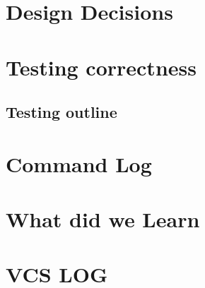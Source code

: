 \documentclass[onecolumn, draftclsnofoot,10pt, compsoc]{IEEEtran}
\begin{document}
	\section{Design Decisions}

	\section{Testing correctness}

	\subsection{Testing outline}

	\section{Command Log}

	\section{What did we Learn}

	\section{VCS LOG}

        
\end{document}
